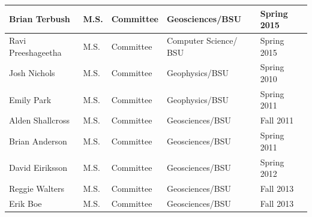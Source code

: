 \documentclass[11pt]{article}
\begin{document}
\begin{table}[!htbp]
\begin{tabular}{|l|l|l|l|l|}
Brian Terbush & M.S. & Committee & Geosciences/BSU & Spring 2015 \\ \hline
Ravi Preeshageetha & M.S. & Committee & Computer Science/ BSU & Spring 2015 \\ \hline
Josh Nichols & M.S. & Committee & Geophysics/BSU & Spring 2010 \\ \hline
Emily Park & M.S. & Committee & Geophysics/BSU & Spring 2011 \\ \hline
Alden Shallcross & M.S. & Committee & Geosciences/BSU & Fall 2011 \\ \hline
Brian Anderson & M.S. & Committee & Geosciences/BSU & Spring 2011 \\ \hline
David Eiriksson & M.S. & Committee & Geosciences/BSU & Spring 2012 \\ \hline
Reggie Walters & M.S. & Committee & Geosciences/BSU & Fall 2013 \\ \hline
Erik Boe & M.S. & Committee & Geosciences/BSU & Fall 2013 \\ \hline
\end{tabular}
\end{table}

\pagebreak
\end{document}
